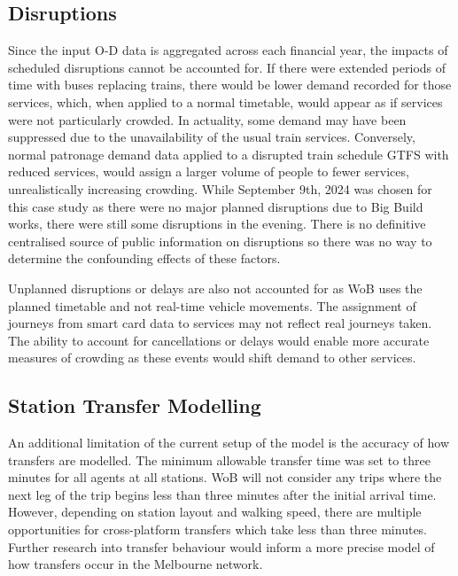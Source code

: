 \subsection{Disruptions}
Since the input O-D data is aggregated across each financial year, the impacts of scheduled disruptions cannot be accounted for. If there were extended periods of time with buses replacing trains, there would be lower demand recorded for those services, which, when applied to a normal timetable, would appear as if services were not particularly crowded. In actuality, some demand may have been suppressed due to the unavailability of the usual train services. Conversely, normal patronage demand data applied to a disrupted train schedule GTFS with reduced services, would assign a larger volume of people to fewer services, unrealistically increasing crowding. While September 9th, 2024 was chosen for this case study as there were no major planned disruptions due to Big Build works, there were still some disruptions in the evening. There is no definitive centralised source of public information on disruptions so there was no way to determine the confounding effects of these factors.

Unplanned disruptions or delays are also not accounted for as WoB uses the planned timetable and not real-time vehicle movements. The assignment of journeys from smart card data to services may not reflect real journeys taken. The ability to account for cancellations or delays would enable more accurate measures of crowding as these events would shift demand to other services. 


\subsection{Station Transfer Modelling}
An additional limitation of the current setup of the model is the accuracy of how transfers are modelled. The minimum allowable transfer time was set to three minutes for all agents at all stations. WoB will not consider any trips where the next leg of the trip begins less than three minutes after the initial arrival time. However, depending on station layout and walking speed, there are multiple opportunities for cross-platform transfers which take less than three minutes. Further research into transfer behaviour would inform a more precise model of how transfers occur in the Melbourne network. 
